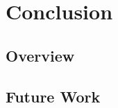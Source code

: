 
\chapter{Conclusion}
\label{conclusion}

\section{Overview}\label{overview}



\newpage
\section{Future Work}\label{futurework}




